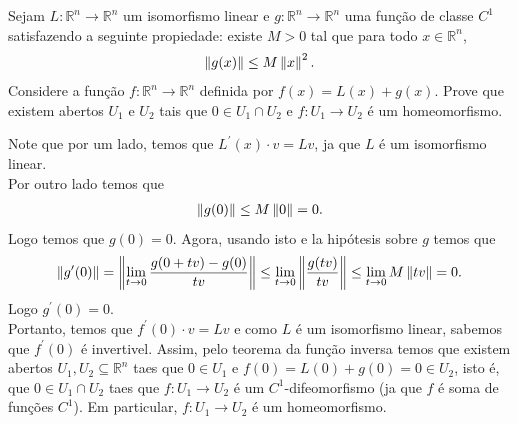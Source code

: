 \begin{homeworkProblem}[Seção 1-5]
  Sejam $L:\mathbb{R}^{n}\to\mathbb{R}^{n}$ um isomorfismo linear e $g:\mathbb{R}^{n}\to\mathbb{R}^{n}$ uma função de classe $C^{1}$ satisfazendo a seguinte propiedade: existe $M>0$ tal que para todo $x\in\mathbb{R}^{n}$,
  \begin{align*}
    \left\|g(x)\right\|\leq M\left\|x\right\|^{2}.
  \end{align*}
  Considere a função $f:\mathbb{R}^{n}\to\mathbb{R}^{n}$ definida por $f(x)=L(x)+g(x)$. Prove que existem abertos $U_1$ e $U_2$ tais que $0\in U_1\cap U_2$ e $f:U_1\to U_2$ é um homeomorfismo. 
  \begin{solution}
    Note que por um lado, temos que $L^{\prime}(x)\cdot v=Lv$, ja que $L$ é um isomorfismo linear.\\
    Por outro lado temos que
    \begin{align*}
      \left\|g(0)\right\|\leq M\left\|0\right\|=0.
    \end{align*}
    Logo temos que $g(0)=0$. Agora, usando isto e la hipótesis sobre $g$ temos que
    \begin{align*}
      \left\|g^{\prime}(0)\right\|=\left\|\lim_{t \to 0}\frac{g(0+tv)-g(0)}{tv}\right\|\leq \lim_{t \to 0}\left\|\frac{g(tv)}{tv}\right\|\leq \lim_{t \to 0}M\left\|tv\right\|=0.
    \end{align*}
    Logo $g^{\prime}(0)=0$.\\
    Portanto, temos que $f^{\prime}(0)\cdot v=Lv$ e como $L$ é um isomorfismo linear, sabemos que $f^{\prime}(0)$ é invertivel. Assim, pelo teorema da função inversa temos que existem abertos $U_1,U_2\subseteq \mathbb{R}^{n}$ taes que $0\in U_1$ e $f(0)=L(0)+g(0)=0\in U_2$, isto é, que $0\in U_1\cap U_2$ taes que $f:U_1\to U_2$ é um $C^{1}$-difeomorfismo (ja que $f$ é soma de funções $C^{1}$). Em particular, $f:U_1\to U_2$ é um homeomorfismo. 
  \end{solution}
\end{homeworkProblem}
